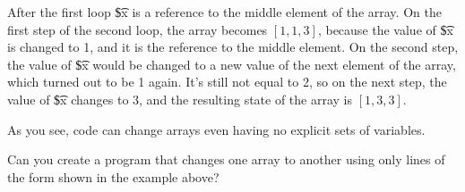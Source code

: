 After the first loop \t{\$x} is a reference to the middle element of the array. On the first step of the second loop, the array becomes $[1, 1, 3]$, because the value of \t{\$x} is changed to 1, and it is the reference to the middle element. On the second step, the value of \t{\$x} would be changed to a new value of the next element of the array, which turned out to be 1 again. It's still not equal to 2, so on the next step, the value of \t{\$x} changes to 3, and the resulting state of the array is $[1, 3, 3]$.

As you see, code can change arrays even having no explicit sets of variables.

Can you create a program that changes one array to another using only lines of the form shown in the example above?